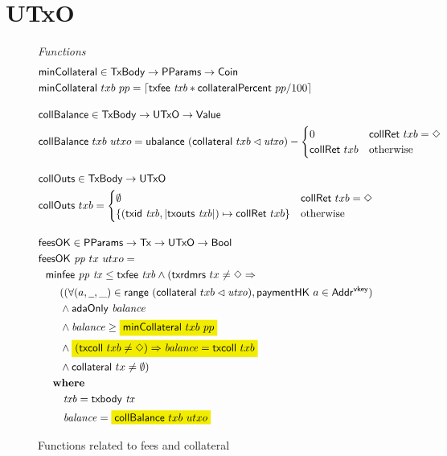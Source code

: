 \section{UTxO}
\label{sec:utxo}

\begin{figure*}[htb]
  \emph{Functions}
  \begin{align*}
    & \fun{minCollateral} \in \TxBody \to \PParams \to \Coin \\
    & \fun{minCollateral}~txb~pp = \lceil \txfee{txb} * \fun{collateralPercent}~pp / 100 \rceil
    \nextdef
    & \fun{collBalance} \in \TxBody \to \UTxO \to \Value \\
    & \fun{collBalance}~txb~utxo = \fun{ubalance}~(\fun{collateral}~{txb} \restrictdom \var{utxo}) -
      \begin{cases}
         0                 & \fun{collRet}~txb = \Nothing \\
         \fun{collRet}~txb & \text{otherwise}
      \end{cases}
    \nextdef
    & \fun{collOuts} \in \TxBody \to \UTxO \\
    & \fun{collOuts}~txb =
      \begin{cases}
        \emptyset                                                      & \fun{collRet}~txb = \Nothing \\
        \{ (\txid{txb}, | \txouts{txb} |) \mapsto \fun{collRet}~txb \} & \text{otherwise}
      \end{cases}
    \nextdef
    & \fun{feesOK} \in \PParams \to \Tx \to \UTxO \to \Bool  \\
    & \fun{feesOK}~\var{pp}~tx~utxo = \\
    &~~      \minfee{pp}{tx} \leq \txfee{txb} \wedge (\fun{txrdmrs}~tx \neq \Nothing \Rightarrow \\
    &~~~~~~((\forall (a, \wcard, \_) \in \fun{range}~(\fun{collateral}~{txb} \restrictdom \var{utxo}), \fun{paymentHK}~a \in \AddrVKey) \\
    &~~~~~~\wedge \fun{adaOnly}~\var{balance} \\
    &~~~~~~\wedge \var{balance} \geq \hldiff{\fun{minCollateral}~txb~pp} \\
    &~~~~~~\wedge \hldiff{(\fun{txcoll}~txb \neq \Nothing) \Rightarrow \var{balance} = \fun{txcoll}~txb} \\
    &~~~~~~\wedge \fun{collateral}~{tx} \neq \emptyset) \\
    &~~      \where \\
    & ~~~~~~~ \var{txb}=\txbody{tx} \\
    & ~~~~~~~ \var{balance}=\hldiff{\fun{collBalance}~txb~utxo}
  \end{align*}
  \caption{Functions related to fees and collateral}
  \label{fig:functions:utxo}
\end{figure*}
